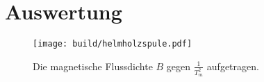 
\section{Auswertung}
\label{sec:Auswertung}

\begin{figure}[H]
	\centering
	\caption{Die magnetische Flussdichte $B$ gegen $\frac{1}{T_m ^2}$ aufgetragen.}
	\texttt{[image: build/helmholzspule.pdf]}
	\label{fig:grad3}
\end{figure}





